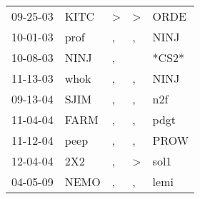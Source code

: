 \begin{supertabular}{lllll}
 09-25-03 &  KITC &  \textgreater &  \textgreater &   ORDE \\
 10-01-03 &  prof &             , &             , &   NINJ \\
 10-08-03 &  NINJ &             , &               &  *CS2* \\
 11-13-03 &  whok &             , &             , &   NINJ \\
 09-13-04 &  SJIM &             , &             , &    n2f \\
 11-04-04 &  FARM &             , &             , &   pdgt \\
 11-12-04 &  peep &             , &             , &   PROW \\
 12-04-04 &   2X2 &             , &  \textgreater &   sol1 \\
 04-05-09 &  NEMO &             , &             , &   lemi \\
\end{supertabular}
